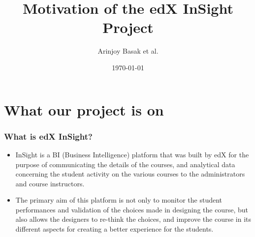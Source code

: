 \documentclass[12pt,xcolor=dvipsnames]{beamer}
\title{Motivation of the edX InSight Project}
\author{Arinjoy Basak et al.}
\date{\today}
\begin{document}
\begin{frame}
\titlepage
\end{frame}



\section{What our project is on}
\begin{frame}[t]
\frametitle{What is edX InSight?}

\begin{itemize}
\item InSight is a BI (Business Intelligence) platform that was built by edX for the purpose of communicating
the details of the courses, and analytical data concerning the student activity on the various courses to
the administrators and course instructors.\\

\item The primary aim of this platform is not only to monitor the
student performances and validation of the choices made in designing the course, but also allows the
designers to re-think the choices, and improve the course in its different aspects for creating a better
experience for the students.
\end{itemize}




\end{frame}
\end{document}
